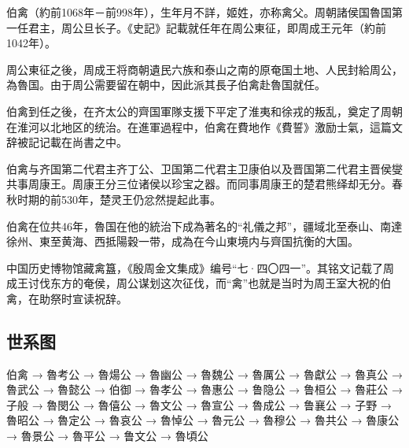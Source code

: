 伯禽（約前1068年－前998年），生年月不詳，姬姓，亦称禽父。周朝諸侯国魯国第一任君主，周公旦长子。《史記》記載就任年在周公東征，即周成王元年（約前1042年）。

周公東征之後，周成王将商朝遺民六族和泰山之南的原奄国土地、人民封給周公，為魯国。由于周公需要留在朝中，因此派其長子伯禽赴魯国就任。

伯禽到任之後，在齐太公的齊国軍隊支援下平定了淮夷和徐戎的叛乱，奠定了周朝在淮河以北地区的统治。在進軍過程中，伯禽在費地作《費誓》激励士氣，這篇文辞被記记載在尚書之中。

伯禽与齐国第二代君主齐丁公、卫国第二代君主卫康伯以及晋国第二代君主晋侯燮共事周康王。周康王分三位诸侯以珍宝之器。而同事周康王的楚君熊绎却无分。春秋时期的前530年，楚灵王仍忿然提起此事。

伯禽在位共46年，魯国在他的統治下成為著名的“礼儀之邦”，疆域北至泰山、南達徐州、東至黄海、西抵陽穀一带，成為在今山東境内与齊国抗衡的大国。

中国历史博物馆藏禽簋，《殷周金文集成》编号“七·四〇四一”。其铭文记载了周成王讨伐东方的奄侯，周公谋划这次征伐，而“禽”也就是当时为周王室大祝的伯禽，在助祭时宣读祝辞。

\subsection{世系图}

\noindent 伯禽 → 魯考公 → 魯煬公 → 魯幽公 → 魯魏公 → 魯厲公 → 魯獻公 → 魯真公 → 魯武公 → 魯懿公 → 伯御 → 魯孝公 → 魯惠公 → 鲁隐公 → 鲁桓公 → 魯莊公 → 子般 → 魯閔公 → 魯僖公 → 魯文公 → 魯宣公 → 魯成公 → 鲁襄公 → 子野 → 魯昭公 → 魯定公 → 魯哀公 → 魯悼公 → 魯元公 → 魯穆公 → 魯共公 → 魯康公 → 魯景公 → 魯平公 → 鲁文公 → 魯頃公


% 
% 
% 
% 
% 
% 
% 
% 
% 
% 
% 
% 
% 
% 


